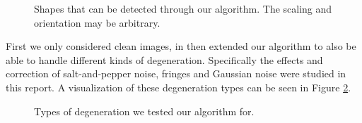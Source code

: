 \documentclass[conference]{IEEEtran}
\begin{document}
\begin{figure}[ht!]%
\centering
{}
\caption{Shapes that can be detected through our algorithm. The scaling and orientation may be arbitrary.}
\label{fig:tranformed_elementary_shapes}
\end{figure}

\noindent
First we only considered clean images, in then extended our algorithm to also be
able to handle different kinds of degeneration. 
Specifically the effects and correction of salt-and-pepper noise, fringes and
Gaussian noise were studied in this report. 
A visualization of these degeneration types can 
be seen in Figure \ref{fig:types_noise}.
\begin{figure}[ht!]%
\centering
{}
\caption{Types of degeneration we tested our algorithm for.}
\label{fig:types_noise}
\end{figure}
\end{document}
